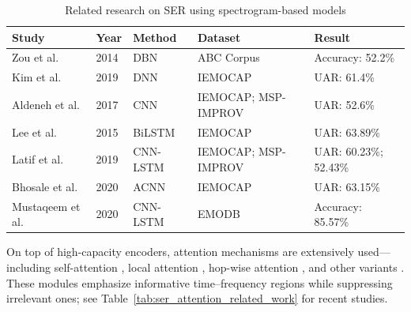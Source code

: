 \begin{table}[h!tbp]
    \centering
    \caption{Related research on SER using spectrogram-based models}
    \label{tab:ser_spectrogram_related_work}
    \small
    \setlength{\tabcolsep}{5pt}
    \renewcommand{\arraystretch}{1.1}
    \begin{tabularx}{\textwidth}{lll>{\raggedright\arraybackslash}X>{\raggedright\arraybackslash}X}
    \hline
    Study & Year & Method & Dataset & Result \\
    \hline
    Zou et al. \cite{cairong2016novel} & 2014 & DBN & ABC Corpus  & Accuracy: 52.2\% \\
    Kim et al. \cite{kim2019dnn} & 2019 & DNN & IEMOCAP & UAR: 61.4\% \\
    Aldeneh et al. \cite{aldeneh2017using} & 2017 & CNN & IEMOCAP; MSP-IMPROV  & UAR: 52.6\% \\
    Lee et al. \cite{lee2015high} & 2015 & BiLSTM & IEMOCAP & UAR: 63.89\% \\
    Latif et al. \cite{latif1904direct} & 2019 & CNN-LSTM & IEMOCAP; MSP-IMPROV & UAR: 60.23\%; 52.43\% \\
    Bhosale et al. \cite{bhosale2020deep} & 2020 & ACNN & IEMOCAP & UAR: 63.15\% \\
    Mustaqeem et al. \cite{sajjad2020clustering} & 2020 & CNN-LSTM & EMODB & Accuracy: 85.57\% \\
    \hline
    \end{tabularx}
\end{table}

On top of high-capacity encoders, attention mechanisms are extensively used—including self-attention \cite{vaswani2017attention}, local attention \cite{mirsamadi2017automatic}, hop-wise attention \cite{yoon2019speech}, and other variants \cite{nediyanchath2020multi,yeh2019interaction}. These modules emphasize informative time–frequency regions while suppressing irrelevant ones; see Table~\ref{tab:ser_attention_related_work} for recent studies.

